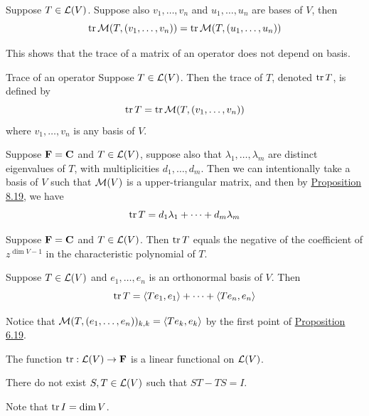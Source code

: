 \documentclass[12pt,a4paper]{article}
\begin{document}
    \begin{prop}
         Suppose $T\in\mathcal{L}(V)$. Suppose also $v_1,\dots,v_n$ and $u_1,\dots,u_n$ are bases of $V$, then
         $$
         \operatorname{tr}\mathcal{M}(T,(v_1,\dots,v_n))=\operatorname{tr}\mathcal{M}(T,(u_1,\dots,u_n))
         $$
    \end{prop}
    \begin{remark}
        This shows that the trace of a matrix of an operator does not depend on basis.
    \end{remark}
    \hfill

    \begin{defi}{Trace of an operator}
        Suppose $T\in\mathcal{L}(V)$. Then the trace of $T$, denoted $\operatorname{tr} T$, is defined by
        $$
        \operatorname{tr} T=\operatorname{tr}\mathcal{M}(T,(v_1,\dots,v_n))
        $$
        where $v_1,\dots,v_n$ is any basis of $V$.
    \end{defi}
    \begin{remark}
        Suppose $\mathbf{F}=\mathbf{C}$ and $T\in\mathcal{L}(V)$, suppose also that $\lambda_1,\dots,\lambda_m$ are distinct eigenvalues of $T$, with multiplicities $d_1,\dots,d_m$. Then we can intentionally take a basis of $V$ such that $\mathcal{M}(V)$ is a upper-triangular matrix, and then by \hyperref[8.19]{Proposition 8.19}, we have
        $$
        \operatorname{tr} T=d_1\lambda_1+\cdots+d_m\lambda_m
        $$
    \end{remark}
    \hfill

    \begin{prop}
        Suppose $\mathbf{F}=\mathbf{C}$ and $T\in\mathcal{L}(V)$. Then $\operatorname{tr} T$ equals the negative of the coefficient of $z^{\dim V-1}$ in the characteristic polynomial of $T$.
    \end{prop}
    \hfill
    
    \begin{prop}
        Suppose $T\in\mathcal{L}(V)$ and $e_1,\dots,e_n$ is an orthonormal basis of $V$. Then
        $$
        \operatorname{tr} T=\langle Te_1,e_1\rangle+\cdots+\langle Te_n,e_n\rangle
        $$
    \end{prop}
    \begin{remark}
        Notice that $\mathcal{M}(T,(e_1,\dots,e_n))_{k,k}=\langle Te_k,e_k\rangle$ by the first point of \hyperref[6.19]{Proposition 6.19}.
    \end{remark}
    \hfill
    
    \begin{prop}
        The function $\operatorname{tr}:\mathcal{L}(V)\to\mathbf{F}$ is a linear functional on $\mathcal{L}(V)$.
    \end{prop}
    \begin{cor}
        There do not exist $S,T\in\mathcal{L}(V)$ such that $ST-TS=I$.
    \end{cor}
    \begin{remark}
        Note that $\operatorname{tr} I=\dim V$.
    \end{remark}
    \hfill
    
\end{document}
